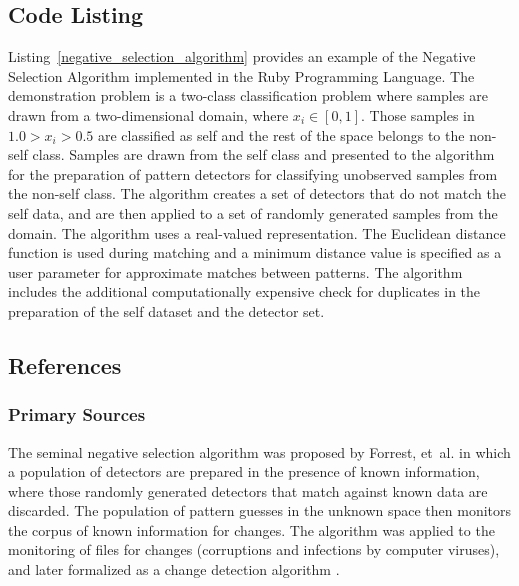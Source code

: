 \subsection{Code Listing}
Listing~\ref{negative_selection_algorithm} provides an example of the Negative Selection Algorithm implemented in the Ruby Programming Language.
The demonstration problem is a two-class classification problem where samples are drawn from a two-dimensional domain, where $x_i \in [0,1]$. Those samples in $1.0>x_i>0.5$ are classified as self and the rest of the space belongs to the non-self class. Samples are drawn from the self class and presented to the algorithm for the preparation of pattern detectors for classifying unobserved samples from the non-self class.
The algorithm creates a set of detectors that do not match the self data, and are then applied to a set of randomly generated samples from the domain. The algorithm uses a real-valued representation. The Euclidean distance function is used during matching and a minimum distance value is specified as a user parameter for approximate matches between patterns. The algorithm includes the additional computationally expensive check for duplicates in the preparation of the self dataset and the detector set.



\subsection{References}

% 
% 
\subsubsection{Primary Sources}
The seminal negative selection algorithm was proposed by Forrest, et~al. \cite{Forrest1994} in which a population of detectors are prepared in the presence of known information, where those randomly generated detectors that match against known data are discarded. The population of pattern guesses in the unknown space then monitors the corpus of known information for changes. The algorithm was applied to the monitoring of files for changes (corruptions and infections by computer viruses), and later formalized as a change detection algorithm \cite{Dhaeseleer1996a, Dhaeseleer1996}.

